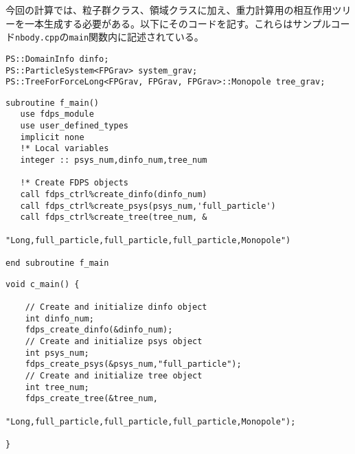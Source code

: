 \ifCpp%
今回の計算では、粒子群クラス、領域クラスに加え、重力計算用の相互作用ツリーを一本生成する必要がある。以下にそのコードを記す。これらはサンプルコード\texttt{nbody.cpp}の\texttt{main}関数内に記述されている。
\begin{lstlisting}[caption=オブジェクトの生成]
PS::DomainInfo dinfo;
PS::ParticleSystem<FPGrav> system_grav;
PS::TreeForForceLong<FPGrav, FPGrav, FPGrav>::Monopole tree_grav;
\end{lstlisting}
\endifCpp
{}
\ifFtn%
\begin{lstlisting}[caption=オブジェクトの生成]
subroutine f_main()
   use fdps_module
   use user_defined_types
   implicit none
   !* Local variables
   integer :: psys_num,dinfo_num,tree_num
   
   !* Create FDPS objects
   call fdps_ctrl%create_dinfo(dinfo_num)
   call fdps_ctrl%create_psys(psys_num,'full_particle')
   call fdps_ctrl%create_tree(tree_num, &
                              "Long,full_particle,full_particle,full_particle,Monopole")

end subroutine f_main
\end{lstlisting}
\endifFtn
\ifC%
\begin{lstlisting}[caption=オブジェクトの生成]
void c_main() {
   
    // Create and initialize dinfo object
    int dinfo_num;
    fdps_create_dinfo(&dinfo_num);
    // Create and initialize psys object
    int psys_num;
    fdps_create_psys(&psys_num,"full_particle");
    // Create and initialize tree object
    int tree_num;
    fdps_create_tree(&tree_num,
                     "Long,full_particle,full_particle,full_particle,Monopole");

}
\end{lstlisting}
\endifC
{}

